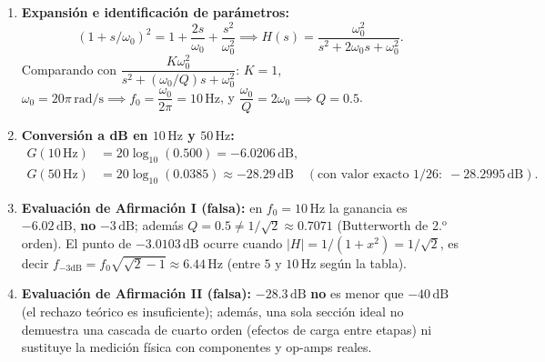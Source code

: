 \documentclass[10pt, a4paper]{article}
\begin{document}
\begin{enumerate}
    \setlength{\itemsep}{2pt}
    \item \textbf{Expansión e identificación de parámetros:}
    \begin{equation}
        (1 + s/\omega_0)^2 = 1 + \frac{2s}{\omega_0} + \frac{s^2}{\omega_0^2}
        \implies H(s) = \frac{\omega_0^2}{s^2 + 2\omega_0 s + \omega_0^2}.
    \end{equation}
    Comparando con $\dfrac{K\omega_0^2}{s^2 + (\omega_0/Q)s + \omega_0^2}$: $K = 1$, $\omega_0 = 20\pi\,\mathrm{rad/s} \implies f_0 = \dfrac{\omega_0}{2\pi} = 10\,\mathrm{Hz}$, y $\dfrac{\omega_0}{Q} = 2\omega_0 \implies Q = 0.5$.
    \item \textbf{Conversión a dB en $10\,\mathrm{Hz}$ y $50\,\mathrm{Hz}$:}
    \begin{align}
        G(10\,\mathrm{Hz}) &= 20\log_{10}(0.500) = -6.0206\,\mathrm{dB}, \\
        G(50\,\mathrm{Hz}) &= 20\log_{10}(0.0385) \approx -28.29\,\mathrm{dB} \quad (\text{con valor exacto } 1/26:\; -28.2995\,\mathrm{dB}).
    \end{align}
    \item \textbf{Evaluación de Afirmación I (falsa):} en $f_0 = 10\,\mathrm{Hz}$ la ganancia es $-6.02\,\mathrm{dB}$, \textbf{no} $-3\,\mathrm{dB}$; además $Q = 0.5 \neq 1/\sqrt{2} \approx 0.7071$ (Butterworth de 2.$^{\mathrm{o}}$ orden). El punto de $-3.0103\,\mathrm{dB}$ ocurre cuando $|H| = 1/(1+x^2) = 1/\sqrt{2}$, es decir $f_{-3\mathrm{dB}} = f_0\sqrt{\sqrt{2}-1} \approx 6.44\,\mathrm{Hz}$ (entre $5$ y $10\,\mathrm{Hz}$ según la tabla).
    \item \textbf{Evaluación de Afirmación II (falsa):} $-28.3\,\mathrm{dB}$ \textbf{no} es menor que $-40\,\mathrm{dB}$ (el rechazo teórico es insuficiente); además, una sola sección ideal no demuestra una cascada de cuarto orden (efectos de carga entre etapas) ni sustituye la medición física con componentes y op-amps reales.
\end{enumerate}

\vspace{3pt}\vspace{3pt}

\end{document}
